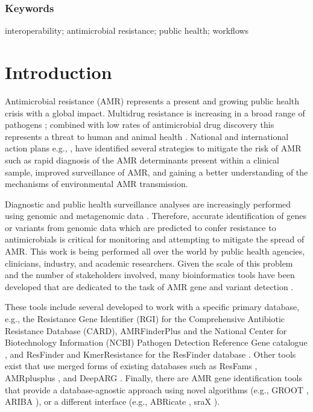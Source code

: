 \subsubsection{Keywords}

interoperability; antimicrobial resistance; public health; workflows

\section{Introduction}

Antimicrobial resistance (AMR) represents a present and growing public health crisis with a global impact.  Multidrug resistance is increasing in a broad range of pathogens \cite{aslam_antibiotic_2018}; combined with low rates of antimicrobial drug discovery \cite{brown_antibacterial_2016} this represents a threat to human and animal health \cite{who_who_2015}. National and international action plans e.g., \cite{jim_oneill_antimicrobial_2014, jim_oneill_tackling_2016, public_health_agency_of_canada_antimicrobial_2014, who_who_2015}, have identified several strategies to mitigate the risk of AMR such as rapid diagnosis of the AMR determinants present within a clinical sample, improved surveillance of AMR, and gaining a better understanding of the mechanisms of environmental AMR transmission.

Diagnostic and public health surveillance analyses are increasingly performed using genomic and metagenomic data \cite{mcarthur_antimicrobial_2017}. Therefore, accurate identification of genes or variants from genomic data which are predicted to confer resistance to antimicrobials is critical for monitoring and attempting to mitigate the spread of AMR. This work is being performed all over the world by public health agencies, clinicians, industry, and academic researchers. Given the scale of this problem and the number of stakeholders involved, many bioinformatics tools have been developed that are dedicated to the task of AMR gene and variant detection \cite{boolchandani_sequencing-based_2019, hendriksen_using_2019, mcarthur_antimicrobial_2017}. 

These tools include several developed to work with a specific primary database, e.g., the Resistance Gene Identifier (RGI) for the Comprehensive Antibiotic Resistance Database (CARD)\cite{alcock_card_2020}, AMRFinderPlus and the National Center for Biotechnology Information (NCBI) Pathogen Detection Reference Gene catalogue \cite{feldgarden_validating_2019}, and ResFinder and KmerResistance \cite{clausen_benchmarking_2016} for the ResFinder database \cite{zankari_identification_2012}. Other tools exist that use merged forms of existing databases such as ResFams \cite{gibson_improved_2015}, AMRplusplus \cite{doster_megares_2020}, and DeepARG \cite{arango-argoty_deeparg_2018}. Finally, there are AMR gene identification tools that provide a database-agnostic approach using novel algorithms (e.g., GROOT \cite{rowe_indexed_2018}, ARIBA \cite{hunt_ariba_2017}), or a different interface (e.g., ABRicate \cite{torsten_seeman_abricate_2020}, sraX \cite{panunzi_srax_2020}). 

